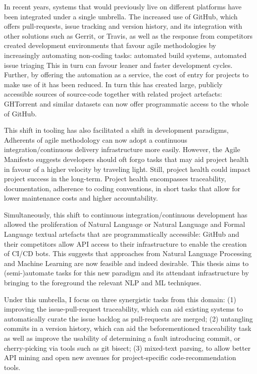 In recent years, systems that would previously live on different platforms have
been integrated under a single umbrella. The increased use of GitHub, which
offers pull-requests, issue tracking and version history, and its integration
with other solutions such as Gerrit, or Travis, as well as the response from
competitors created development environments that favour agile methodologies by
increasingly automating non-coding tasks: automated build systems, automated
issue triaging \etc This in turn can favour leaner and faster development
cycles. Further, by offering the automation as a service, the cost of entry for
projects to make use of it has been reduced. In turn this has created large,
publicly accessible sources of source-code together with related project
artefacts: GHTorrent and similar datasets can now offer programmatic access to
the whole of GitHub.

This shift in tooling has also facilitated a shift in development paradigms,
Adherents of agile methodology can now adopt a continuous integration/continuous
delivery infrastructure more easily. However, the Agile Manifesto suggests
developers should oft forgo tasks that may aid project health in favour of a
higher velocity by traveling light. Still, project health could impact project
success in the long-term. Project health encompasses traceability,
documentation, adherence to coding conventions, in short tasks that allow for
lower maintenance costs and higher accountability.

Simultaneously, this shift to continuous integration/continuous development has
allowed the proliferation of Natural Language or Natural Language and Formal
Language textual artefacts that are programmatically accessible: GitHub and
their competitors allow API access to their infrastructure to enable the
creation of CI/CD bots. This suggests that approaches from Natural Language
Processing and Machine Learning are now feasible and indeed desirable. This
thesis aims to (semi-)automate tasks for this new paradigm and its attendant
infrastructure by bringing to the foreground the relevant NLP and ML techniques.

Under this umbrella, I focus on three synergistic tasks from this domain: (1)
improving the issue-pull-request traceability, which can aid existing systems to
automatically curate the issue backlog as pull-requests are merged; (2)
untangling commits in a version history, which can aid the beforementioned
traceability task as well as improve the usability of determining a fault
introducing commit, or cherry-picking via tools such as git bisect; (3)
mixed-text parsing, to allow better API mining and open new avenues for
project-specific code-recommendation tools.